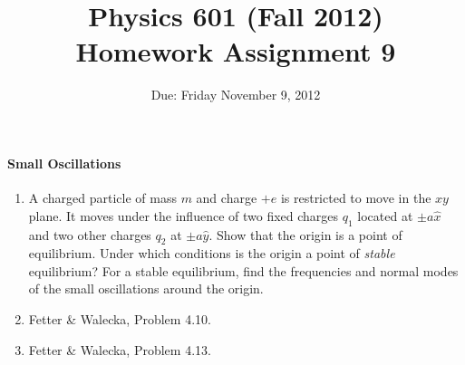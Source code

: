\documentclass[letterpaper,11pt]{article}
\title{Physics 601 (Fall 2012) \\ Homework Assignment 9}
\date{Due: Friday November 9, 2012}
\begin{document}
\maketitle

\paragraph*{Small Oscillations}
\begin{enumerate}
 \item A charged particle of mass $m$ and charge $+e$ is restricted to move in the $xy$ plane.  It moves under the influence of two fixed charges $q_1$ located at $\pm a \hat{x}$ and two other charges $q_2$ at $\pm a \hat{y}$.  Show that the origin is a point of equilibrium.  Under which conditions is the origin a point of \emph{stable} equilibrium?  For a stable equilibrium, find the frequencies and normal modes of the small oscillations around the origin.
 \item Fetter \& Walecka, Problem 4.10.
 \item Fetter \& Walecka, Problem 4.13.
\end{enumerate}
\end{document}
